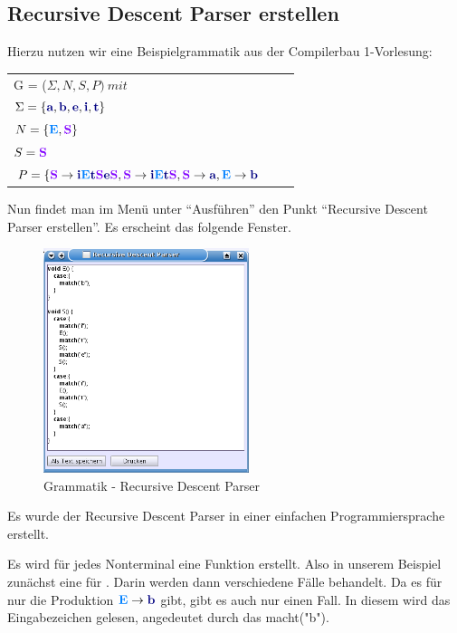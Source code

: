 \subsection{Recursive Descent Parser erstellen}

Hierzu nutzen wir eine Beispielgrammatik aus der Compilerbau 1-Vorlesung:

\begin{tabular}{lcr}
G = ($\Sigma, N, S, P )\ mit $\\
$\Sigma = \{\TerminalSymbol{a}, \TerminalSymbol{b}, \TerminalSymbol{e},
\TerminalSymbol{i},\TerminalSymbol{t}\}$\\ $N =
\{\NonterminalSymbol{E}, \StartSymbol{S}\}$\\ $S=\StartSymbol{S}$\\
$P = \{\StartSymbol{S} \to \TerminalSymbol{i}\NonterminalSymbol{E}\TerminalSymbol{t}\StartSymbol{S}\TerminalSymbol{e}\StartSymbol{S},\StartSymbol{S} \to \TerminalSymbol{i}\NonterminalSymbol{E}\TerminalSymbol{t}\StartSymbol{S}, \StartSymbol{S} \to \TerminalSymbol{a}, \NonterminalSymbol{E} \to \TerminalSymbol{b}$\\
\end{tabular}

Nun findet man im Menü unter "`Ausführen"' den Punkt "`Recursive Descent Parser erstellen"'. Es erscheint das folgende Fenster.

\begin{figure}[h]
\begin{center}
\includegraphics[width=6cm]{../images/rdp.png}
\caption{Grammatik - Recursive Descent Parser}
\end{center}
\end{figure}

Es wurde der Recursive Descent Parser in einer einfachen Programmiersprache erstellt.

Es wird für jedes Nonterminal eine Funktion erstellt. Also in unserem Beispiel zunächst eine für . Darin werden dann verschiedene Fälle behandelt. Da es für  nur die Produktion $\NonterminalSymbol{E} \to \TerminalSymbol{b}$ gibt, gibt es auch nur einen Fall. In diesem wird das Eingabezeichen  gelesen, angedeutet durch das macht("b").

